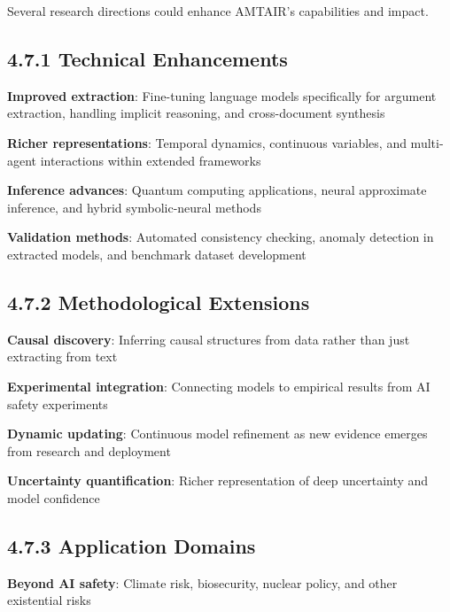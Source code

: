 \documentclass[
  11pt,
  letterpaper,
]{book}
\begin{document}

Several research directions could enhance AMTAIR's capabilities and
impact.

\subsection*{4.7.1 Technical Enhancements}\label{sec-technical-future}

\textbf{Improved extraction}: Fine-tuning language models specifically
for argument extraction, handling implicit reasoning, and cross-document
synthesis

\textbf{Richer representations}: Temporal dynamics, continuous
variables, and multi-agent interactions within extended frameworks

\textbf{Inference advances}: Quantum computing applications, neural
approximate inference, and hybrid symbolic-neural methods

\textbf{Validation methods}: Automated consistency checking, anomaly
detection in extracted models, and benchmark dataset development

\subsection*{4.7.2 Methodological
Extensions}\label{sec-methodological-future}

\textbf{Causal discovery}: Inferring causal structures from data rather
than just extracting from text

\textbf{Experimental integration}: Connecting models to empirical
results from AI safety experiments

\textbf{Dynamic updating}: Continuous model refinement as new evidence
emerges from research and deployment

\textbf{Uncertainty quantification}: Richer representation of deep
uncertainty and model confidence

\subsection*{4.7.3 Application Domains}\label{sec-application-future}

\textbf{Beyond AI safety}: Climate risk, biosecurity, nuclear policy,
and other existential risks
\end{document}
